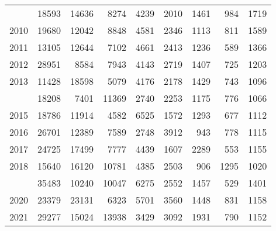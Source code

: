 \documentclass[
]{article}
\begin{document}
\begin{longtable}[t]{lrrrrrrrr}
\addlinespace
2009 & 18593 & 14636 & 8274 & 4239 & 2010 & 1461 & 984 & 1719\\
2010 & 19680 & 12042 & 8848 & 4581 & 2346 & 1113 & 811 & 1589\\
2011 & 13105 & 12644 & 7102 & 4661 & 2413 & 1236 & 589 & 1366\\
2012 & 28951 & 8584 & 7943 & 4143 & 2719 & 1407 & 725 & 1203\\
2013 & 11428 & 18598 & 5079 & 4176 & 2178 & 1429 & 743 & 1096\\
\addlinespace
2014 & 18208 & 7401 & 11369 & 2740 & 2253 & 1175 & 776 & 1066\\
2015 & 18786 & 11914 & 4582 & 6525 & 1572 & 1293 & 677 & 1112\\
2016 & 26701 & 12389 & 7589 & 2748 & 3912 & 943 & 778 & 1115\\
2017 & 24725 & 17499 & 7777 & 4439 & 1607 & 2289 & 553 & 1155\\
2018 & 15640 & 16120 & 10781 & 4385 & 2503 & 906 & 1295 & 1020\\
\addlinespace
2019 & 35483 & 10240 & 10047 & 6275 & 2552 & 1457 & 529 & 1401\\
2020 & 23379 & 23131 & 6323 & 5701 & 3560 & 1448 & 831 & 1158\\
2021 & 29277 & 15024 & 13938 & 3429 & 3092 & 1931 & 790 & 1152\\*
\end{longtable}
\end{document}
